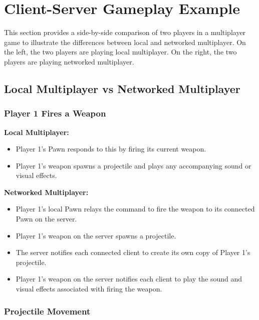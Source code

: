 \documentclass[
  letterpaper,
  DIV=11,
  numbers=noendperiod]{scrartcl}
\providecommand{\tightlist}{%
  \setlength{\itemsep}{0pt}\setlength{\parskip}{0pt}}
\begin{document}
\section{Client-Server Gameplay
Example}\label{client-server-gameplay-example}

This section provides a side-by-side comparison of two players in a
multiplayer game to illustrate the differences between local and
networked multiplayer. On the left, the two players are playing local
multiplayer. On the right, the two players are playing networked
multiplayer.

\subsection{Local Multiplayer vs Networked
Multiplayer}\label{local-multiplayer-vs-networked-multiplayer}

\subsubsection{Player 1 Fires a Weapon}\label{player-1-fires-a-weapon}

\textbf{Local Multiplayer:}

\begin{itemize}
\tightlist
\item
  Player 1's Pawn responds to this by firing its current weapon.
\item
  Player 1's weapon spawns a projectile and plays any accompanying sound
  or visual effects.
\end{itemize}

\textbf{Networked Multiplayer:}

\begin{itemize}
\tightlist
\item
  Player 1's local Pawn relays the command to fire the weapon to its
  connected Pawn on the server.
\item
  Player 1's weapon on the server spawns a projectile.
\item
  The server notifies each connected client to create its own copy of
  Player 1's projectile.
\item
  Player 1's weapon on the server notifies each client to play the sound
  and visual effects associated with firing the weapon.
\end{itemize}

\subsubsection{Projectile Movement}\label{projectile-movement}
\end{document}
